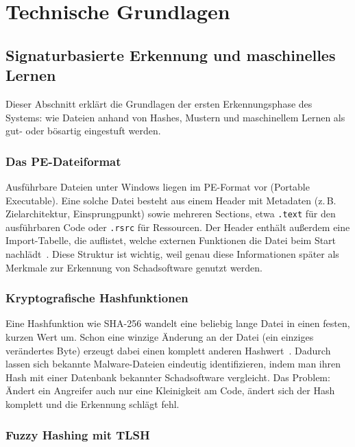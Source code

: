 
\pagebreak

\chapter{Technische Grundlagen}

\section{Signaturbasierte Erkennung und maschinelles Lernen}

Dieser Abschnitt erklärt die Grundlagen der ersten Erkennungsphase des
Systems: wie Dateien anhand von Hashes, Mustern und maschinellem Lernen
als gut- oder bösartig eingestuft werden.

\subsection{Das PE-Dateiformat}

Ausführbare Dateien unter Windows liegen im \ac{PE}-Format vor
(Portable Executable). Eine solche Datei besteht aus einem Header mit
Metadaten (z.\,B. Zielarchitektur, Einsprungpunkt) sowie mehreren
Sections, etwa \texttt{.text} für den ausführbaren Code oder
\texttt{.rsrc} für Ressourcen. Der Header enthält außerdem eine
Import-Tabelle, die auflistet, welche externen Funktionen die Datei beim
Start nachlädt~\cite{pe-format}. Diese Struktur ist wichtig, weil genau
diese Informationen später als Merkmale zur Erkennung von Schadsoftware
genutzt werden.

\subsection{Kryptografische Hashfunktionen}

Eine Hashfunktion wie \ac{SHA}-256 wandelt eine beliebig lange Datei in
einen festen, kurzen Wert um. Schon eine winzige Änderung an der Datei
(ein einziges verändertes Byte) erzeugt dabei einen komplett anderen
Hashwert~\cite{sha256-spec}. Dadurch lassen sich bekannte
Malware-Dateien eindeutig identifizieren, indem man ihren Hash mit einer
Datenbank bekannter Schadsoftware vergleicht. Das Problem: Ändert ein
Angreifer auch nur eine Kleinigkeit am Code, ändert sich der Hash
komplett und die Erkennung schlägt fehl.

\subsection{Fuzzy Hashing mit TLSH}

